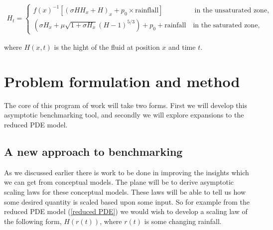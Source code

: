 \documentclass[11pt]{article}
\begin{document}
 \begin{align}
    H_t=\begin{cases}
        f(x)^{-1}[(\sigma HH_x+H)_x+p_0\times\text {rainflall}] \qquad \qquad  \ \; \text{in the unsaturated zone},\\
        (\sigma H_x+\mu\sqrt{1+\sigma H_x}(H-1)^{5/3})+p_0 +\text{rainfall} \quad \text{in the saturated zone}, \label{reduced PDE}
    \end{cases}
\end{align}

where $H(x,t)$ is the hight of the fluid at position $x$ and time $t$.


\section{Problem formulation and method}
The core of this program of work will take two forms. First we will develop this asymptotic benchmarking tool, and secondly we will explore expansions to the reduced PDE model. 
\subsection{A new approach to benchmarking}
As we discussed earlier there is work to be done in improving the insights which we can get from conceptual models. The plane will be to derive asymptotic scaling laws for these conceptual models. These laws will be able to tell us how some desired quantity is scaled based upon some input. So for example from the reduced PDE model (\ref{reduced PDE}) we would wish to develop a scaling law of the following form, $H(r(t))$, where $r(t)$ is some changing rainfall. 

\vspace{5pt}
\end{document}
